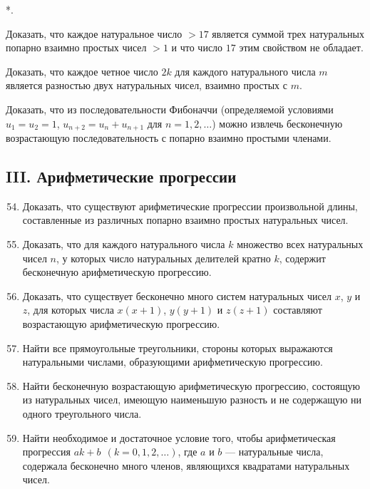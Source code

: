 \documentclass[12pt, a4paper, openany]{book}
\newcounter{namedlistcounter}  %
\newenvironment{withdot}
{\begin{list}
		{\arabic{namedlistcounter}*.} %
		{\usecounter{namedlistcounter}   %
			\setlength{\leftmargin}{3em}} %
	}
	{\end{list}}
\begin{document}
\begin{withdot}
	\addtocounter{namedlistcounter}{50}
	\item Доказать, что каждое натуральное число $>17$ является суммой трех натуральных попарно взаимно простых чисел $>1$ и что число $17$ этим свойством не обладает.
	\item Доказать, что каждое четное число $2k$ для каждого натурального числа $m$ является разностью двух натуральных чисел, взаимно простых с $m$.
	\item Доказать, что из последовательности Фибоначчи (определяемой условиями $u_1=u_2=1$, $u_{n+2}=u_n+u_{n+1}$ для $n=1, 2, \ldots$) можно извлечь бесконечную возрастающую последовательность с попарно взаимно простыми членами.
	
\end{withdot}

\subsection[III. Арифметические прогрессии (54-75)]{\center III. Арифметические прогрессии}

\begin{enumerate}
	\setcounter{enumi}{53}
	\item Доказать, что существуют арифметические прогрессии произвольной длины, составленные из различных попарно взаимно простых	натуральных чисел.
	\item Доказать, что для каждого натурального числа $k$ множество всех натуральных чисел $n$, у которых число натуральных делителей кратно $k$, содержит бесконечную арифметическую прогрессию.
	\item Доказать, что существует бесконечно много систем натуральных чисел $x$, $y$ и $z$, для которых числа $x(x+1)$, $y(y+1)$ и $z(z+1)$ составляют возрастающую арифметическую прогрессию.
	\item Найти все прямоугольные треугольники, стороны которых выражаются натуральными числами, образующими арифметическую прогрессию.
	\item Найти бесконечную возрастающую арифметическую прогрессию,	состоящую из натуральных чисел, имеющую наименьшую разность и не содержащую ни одного треугольного числа.
	\item Найти необходимое и достаточное условие того, чтобы арифметическая прогрессия $ak+b \ \ (k=0,1,2, \ldots)$, где $a$ и $b$ — натуральные числа, содержала бесконечно много членов, являющихся квадратами натуральных чисел.
\end{enumerate}
\end{document}
